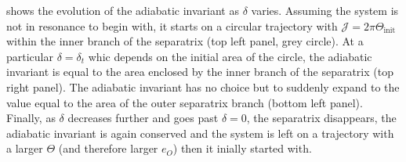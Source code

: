 \documentclass[ twoside,openright,titlepage,numbers=noenddot,headinclude,%
                footinclude=true,cleardoublepage=empty,abstractoff, %
                BCOR=5mm,paper=a4,fontsize=11pt,%
                american,%
                ]{scrreprt}
\begin{document}
 shows the evolution of the adiabatic 
invariant as $\delta$ varies. Assuming the system is not in resonance
to begin with, it starts on a circular trajectory with $\mathcal{J}
=2\pi\Theta_\text{init}$ within the inner branch of the separatrix
(top left panel, grey circle). At a particular $\delta=\delta_t$
whic depends on the initial area of the circle, the adiabatic 
invariant is equal to the area enclosed by the inner branch of the
separatrix (top right panel). The adiabatic invariant has no choice
but to suddenly expand to the value equal to the area of the
outer separatrix branch (bottom left panel). Finally, as $\delta$
decreases further and goes past $\delta=0$, the separatrix
disappears, the adiabatic invariant is again conserved and the 
system is left on a trajectory with a larger $\Theta$ (and
therefore larger $e_O$) then it inially started with.
\end{document}
